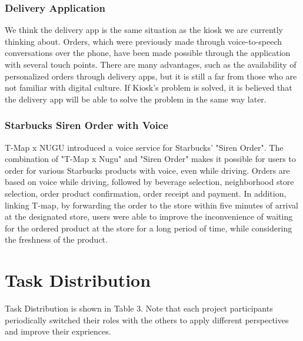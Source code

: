 \documentclass[conference,compsoc]{IEEEtran}
\begin{document}
\subsubsection{Delivery Application}
We think the delivery app is the same situation as the kiosk we are currently thinking about. Orders, which were previously made through voice-to-speech conversations over the phone, have been made possible through the application with several touch points. There are many advantages, such as the availability of personalized orders through delivery apps, but it is still a far from those who are not familiar with digital culture. If Kiosk's problem is solved, it is believed that the delivery app will be able to solve the problem in the same way later.

\subsubsection{Starbucks Siren Order with Voice}
T-Map x NUGU introduced a voice service for Starbucks' "Siren Order". The combination of "T-Map x Nugu" and "Siren Order" makes it possible for users to order for various Starbucks products with voice, even while driving. Orders are based on voice while driving, followed by beverage selection, neighborhood store selection, order product confirmation, order receipt and payment. In addition, linking T-map, by forwarding the order to the store within five minutes of arrival at the designated store, users were able to improve the inconvenience of waiting for the ordered product at the store for a long period of time, while considering the freshness of the product.

\section{Task Distribution}

Task Distribution is shown in Table 3. Note that each project participants periodically switched their roles with the others to apply different perspectives and improve their expriences.
\end{document}
